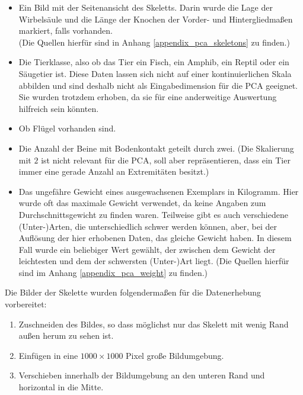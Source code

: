  \begin{itemize}
  \item Ein Bild mit der Seitenansicht des Skeletts.
  Darin wurde die Lage der Wirbelsäule und die Länge der Knochen der Vorder- und Hintergliedmaßen markiert, falls vorhanden.\\
  (Die Quellen hierfür sind in Anhang \ref{appendix_pca_skeletons} zu finden.)
  
  \item Die Tierklasse, also ob das Tier ein Fisch, ein Amphib, ein Reptil oder ein Säugetier ist. Diese Daten lassen sich nicht auf einer kontinuierlichen Skala abbilden und sind deshalb nicht als Eingabedimension für die PCA geeignet. Sie wurden trotzdem erhoben, da sie für eine anderweitige Auswertung hilfreich sein könnten.
  
  \item Ob Flügel vorhanden sind.
  
  \item Die Anzahl der Beine mit Bodenkontakt geteilt durch zwei. (Die Skalierung mit $2$ ist nicht relevant für die PCA, soll aber repräsentieren, dass ein Tier immer eine gerade Anzahl an Extremitäten besitzt.)
  
  \item Das ungefähre Gewicht eines ausgewachsenen Exemplars in Kilogramm. Hier wurde oft das maximale Gewicht verwendet, da keine Angaben zum Durchschnittsgewicht zu finden waren. Teilweise gibt es auch verschiedene (Unter-)Arten, die unterschiedlich schwer werden können, aber, bei der Auflösung der hier erhobenen Daten, das gleiche Gewicht haben. In diesem Fall wurde ein beliebiger Wert gewählt, der zwischen dem Gewicht der leichtesten und dem der schwersten (Unter-)Art liegt. (Die Quellen hierfür sind im Anhang \ref{appendix_pca_weight} zu finden.)
 \end{itemize}

 Die Bilder der Skelette wurden folgendermaßen für die Datenerhebung vorbereitet:
 
 \begin{enumerate}
  \item Zuschneiden des Bildes, so dass möglichst nur das Skelett mit wenig Rand außen herum zu sehen ist.
  \item Einfügen in eine $1000 \times 1000$ Pixel große Bildumgebung.
  \item Verschieben innerhalb der Bildumgebung an den unteren Rand und horizontal in die Mitte.
 \end{enumerate}

